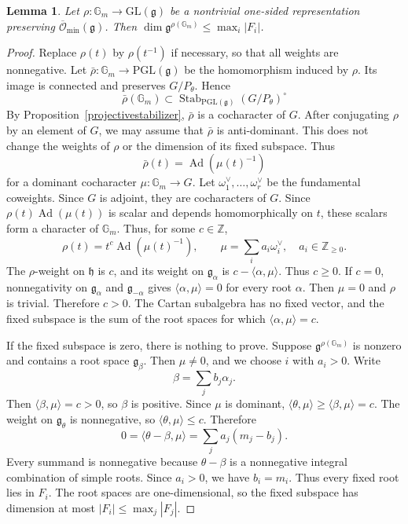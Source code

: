 \documentclass[12pt]{article}
\newtheorem{lemma}[theorem]{Lemma}
\theoremstyle{definition}
\DeclareMathOperator{\Ad}{Ad}
\DeclareMathOperator{\Stab}{Stab}
\newcommand{\Gm}{\mathbb G_m}
\newcommand{\GL}{\mathrm{GL}}
\newcommand{\PGL}{\mathrm{PGL}}
\newcommand{\Lieg}{\mathfrak{g}}
\newcommand{\h}{\mathfrak h}
\newcommand{\Ominbar}{\overline{\mathcal O}_{\min}}
\begin{document}
\begin{lemma}\label{onesided}
    Let $\rho:\Gm\to\GL(\Lieg)$ be a nontrivial one-sided representation preserving $\Ominbar(\Lieg)$. Then $\dim\Lieg^{\rho(\Gm)}\le\max_i|F_i|$.
\end{lemma}
\begin{proof}
    Replace $\rho(t)$ by $\rho(t^{-1})$ if necessary, so that all weights are nonnegative. Let $\bar\rho:\Gm\to\PGL(\Lieg)$ be the homomorphism induced by $\rho$. Its image is connected and preserves $G/P_\theta$. Hence
    \[
        \bar\rho(\Gm)\subset
        \Stab_{\PGL(\Lieg)}(G/P_\theta)^\circ
    \]
    By Proposition~\ref{projectivestabilizer}, $\bar\rho$ is a cocharacter of $G$. After conjugating $\rho$ by an element of $G$, we may assume that $\bar\rho$ is anti-dominant. This does not change the weights of $\rho$ or the dimension of its fixed subspace. Thus
    \[
        \bar\rho(t)=\Ad(\mu(t)^{-1})
    \]
    for a dominant cocharacter $\mu:\Gm\to G$. Let $\omega_1^\vee,\ldots,\omega_r^\vee$ be the fundamental coweights. Since $G$ is adjoint, they are cocharacters of $G$.
    Since $\rho(t)\Ad(\mu(t))$ is scalar and depends homomorphically on $t$, these scalars form a character of $\Gm$. Thus, for some $c\in\mathbb Z$,
    \[
        \rho(t)=t^c\Ad(\mu(t)^{-1}),\qquad
        \mu=\sum_i a_i\omega_i^\vee,\quad a_i\in\mathbb Z_{\ge0}.
    \]
    The $\rho$-weight on $\h$ is $c$, and its weight on $\Lieg_\alpha$ is $c-\langle\alpha,\mu\rangle$. Thus $c\ge0$. If $c=0$, nonnegativity on $\Lieg_\alpha$ and $\Lieg_{-\alpha}$ gives $\langle\alpha,\mu\rangle=0$ for every root $\alpha$. Then $\mu=0$ and $\rho$ is trivial. 
    Therefore $c>0$. The Cartan subalgebra has no fixed vector, and the fixed subspace is the sum of the root spaces for which $\langle\alpha,\mu\rangle=c$.

    If the fixed subspace is zero, there is nothing to prove. Suppose $\Lieg^{\rho(\Gm)}$ is nonzero and contains a root space $\Lieg_\beta$. Then $\mu\neq 0$, and we choose $i$ with $a_i>0$. Write $$\beta=\sum_j b_j\alpha_j.$$ Then $\langle\beta,\mu\rangle=c>0$, so $\beta$ is positive. Since $\mu$ is dominant, $\langle\theta,\mu\rangle\ge\langle\beta,\mu\rangle=c$. The weight on $\Lieg_\theta$ is nonnegative, so $\langle\theta,\mu\rangle\le c$. Therefore
    \[
        0=\langle\theta-\beta,\mu\rangle
        =\sum_j a_j(m_j-b_j).
    \]
    Every summand is nonnegative because $\theta-\beta$ is a nonnegative integral combination of simple roots. Since $a_i>0$, we have $b_i=m_i$. Thus every fixed root lies in $F_i$. The root spaces are one-dimensional, so the fixed subspace has dimension at most $|F_i|\le\max_j|F_j|$.
\end{proof}
\end{document}
